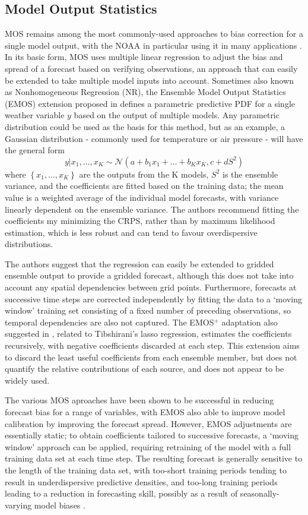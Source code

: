 \documentclass[10pt,fleqn]{article}
\begin{document}
\subsection*{Model Output Statistics}
MOS remains among the most commonly-used approaches to bias correction for a single model output, with the NOAA in particular using it in many applications \cite{NOAAMOS}. In its basic form, MOS uses multiple linear regression to adjust the bias and spread of a forecast based on verifying observations, an approach that can easily be extended to take multiple model inputs into account. Sometimes also known as Nonhomogeneous Regression (NR), the Ensemble Model Output Statistics (EMOS) extension proposed in \cite{Gneiting2005} defines a parametric predictive PDF for a single weather variable $y$ based on the output of multiple models. Any parametric distribution could be used as the basis for this method, but as an example, a Gaussian distribution - commonly used for temperature or air pressure - will have the general form
\[ y | x_1, \dots, x_K \sim \mathcal{N} \left( a + b_1 x_1 + \dots + b_K x_K, c + dS^2 \right) \] 
where $\left\{ x_1, \dots, x_K \right\}$ are the outputs from the K models, $S^2$ is the ensemble variance, and the coefficients are fitted based on the training data; the mean value is a weighted average of the individual model forecasts, with variance linearly dependent on the ensemble variance. The authors recommend fitting the coefficients my minimizing the CRPS, rather than by maximum likelihood estimation, which is less robust and can tend to favour overdispersive distributions. 

The authors suggest that the regression can easily be extended to gridded ensemble output to provide a gridded forecast, although this does not take into account any spatial dependencies between grid points. Furthermore, forecasts at successive time steps are corrected independently by fitting the data to a `moving window' training set consisting of a fixed number of preceding observations, so temporal dependencies are also not captured. The EMOS$^+$ adaptation also suggested in \cite{Gneiting2005}, related to Tibshirani's lasso regression, estimates the coefficients recursively, with negative coefficients discarded at each step. This extension aims to discard the least useful coefficients from each ensemble member, but does not quantify the relative contributions of each source, and does not appear to be widely used. 

The various MOS aproaches have been shown to be successful in reducing forecast bias for a range of variables, with EMOS also able to improve model calibration by improving the forecast spread. However, EMOS adjustments are essentially static; to obtain coefficients tailored to successive forecasts, a `moving window' approach can be  applied, requiring retraining of the model with a full training data set at each time step. The resulting forecast is generally sensitive to the length of the training data set, with too-short training periods tending to result in underdispersive predictive densities, and too-long training periods leading to a reduction in forecasting skill, possibly as a result of seasonally-varying model biases \cite{Gneiting2005}.
\end{document}
